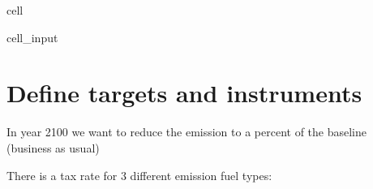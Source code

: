 \documentclass[letterpaper,10pt,english]{jupyterBook}
\begin{document}
\begin{sphinxuseclass}{cell}\begin{sphinxVerbatimInput}

\begin{sphinxuseclass}{cell_input}
\begin{sphinxVerbatim}[commandchars=\\\{\}]
  
\end{sphinxVerbatim}

\end{sphinxuseclass}\end{sphinxVerbatimInput}

\end{sphinxuseclass}

\section{Define targets and instruments}
\label{\detokenize{content/howto/targetinstruments/One target one instrument with 3 instrument variables:define-targets-and-instruments}}
\sphinxAtStartPar
In year 2100 we want to reduce the emission  to a percent of the baseline (business as usual)

\sphinxAtStartPar
There is a tax rate for 3 different emission fuel types:
\end{document}
